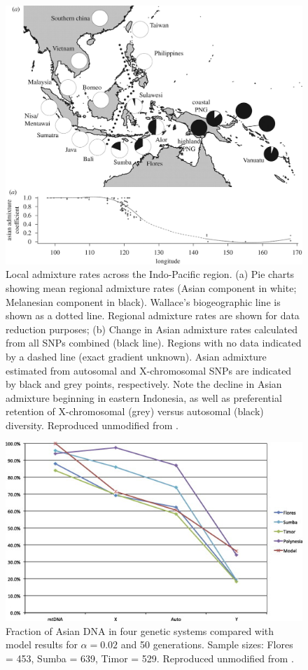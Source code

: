 \documentclass[a4paper,12pt]{report}
\begin{document}
\begin{figure}[!htbp]
	\hspace*{-1cm}
	\includegraphics[scale=0.25]{../data/cox-image.jpg}
	\caption{Local admixture rates across the Indo-Pacific region. (a) Pie charts showing mean regional admixture rates (Asian component in white; Melanesian component in black). Wallace's biogeographic line is shown as a dotted line. Regional admixture rates are shown for data reduction purposes; (b) Change in Asian admixture rates calculated from all SNPs combined (black line). Regions with no data indicated by a dashed line (exact gradient unknown). Asian admixture estimated from autosomal and X-chromosomal SNPs are indicated by black and grey points, respectively. Note the decline in Asian admixture beginning in eastern Indonesia, as well as preferential retention of X-chromosomal (grey) versus autosomal (black) diversity. Reproduced unmodified from \cite{Cox01}.}
	\label{cox-image}
\end{figure}

\begin{figure}[!htbp]
	\centering
	\includegraphics[scale=1.25]{../data/lansing-image.jpg}
	\caption{Fraction of Asian DNA in four genetic systems compared with model results for $\alpha = 0.02$ and 50 generations. Sample sizes: Flores = 453, Sumba = 639, Timor = 529. Reproduced unmodified from \cite{Lan01}.}
	\label{lansing-image}
\end{figure}
\end{document}
